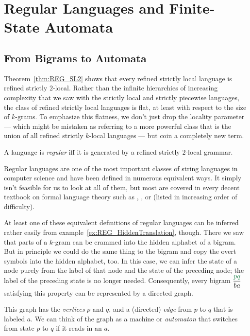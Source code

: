 \section{Regular Languages and Finite-State Automata}

\subsection{From Bigrams to Automata}

Theorem~\ref{thm:REG_SL2} shows that every refined strictly local language is refined strictly $2$-local.
Rather than the infinite hierarchies of increasing complexity that we saw with the strictly local and strictly piecewise languages, the class of refined strictly local languages is flat, at least with respect to the size of $k$-grams.
To emphasize this flatness, we don't just drop the locality parameter --- which might be mistaken as referring to a more powerful class that is the union of all refined strictly $k$-local languages --- but coin a completely new term.
%
\begin{definition}
    A language is \emph{regular} iff it is generated by a refined strictly $2$-local grammar.
\end{definition}
%
Regular languages are one of the most important classes of string languages in computer science and have been defined in numerous equivalent ways.
It simply isn't feasible for us to look at all of them, but most are covered in every decent textbook on formal language theory such as \citet{Sipser05}, \citet{Kozen97}, or \citet{HopcroftUllman79} (listed in increasing order of difficulty).

At least one of these equivalent definitions of regular languages can be inferred rather easily from example~\ref{ex:REG_HiddenTranslation}, though.
There we saw that parts of a $k$-gram can be crammed into the hidden alphabet of a bigram.
But in principle we could do the same thing to the bigram and copy the overt symbols into the hidden alphabet, too.
In this case, we can infer the state of a node purely from the label of that node and the state of the preceding node; the label of the preceding state is no longer needed.
Consequently, every bigram $\kState{p q}{b a}$ satisfying this property can be represented by a directed graph.
%
\begin{center}
    
\end{center}
%
This graph has the \emph{vertices} $p$ and $q$, and a (directed) \emph{edge} from $p$ to $q$ that is labeled $a$.
We can think of the graph as a machine or \emph{automaton} that switches from state $p$ to $q$ if it reads in an $a$.

